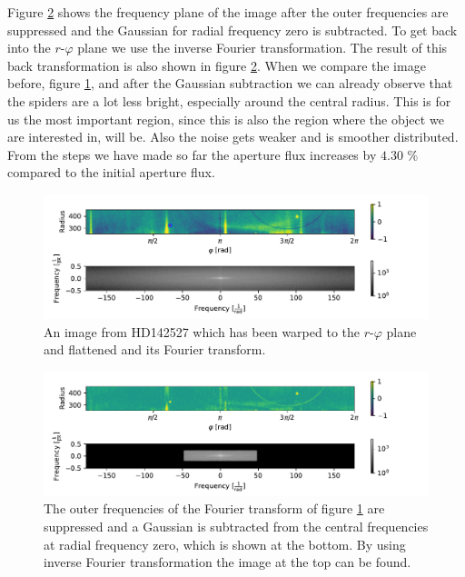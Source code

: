 Figure \ref{fig:HDcentralfreq_R254_R454_-1to1} shows the frequency plane of the image after the outer frequencies are suppressed and the Gaussian for radial frequency zero is subtracted. To get back into the $r$-$\varphi$ plane we use the inverse Fourier transformation. The result of this back transformation is also shown in figure \ref{fig:HDcentralfreq_R254_R454_-1to1}. When we compare the image before, figure \ref{fig:HDflatten_R254_R454_-1to1}, and after the Gaussian subtraction we can already observe that the spiders are a lot less bright, especially around the central radius. This is for us the most important region, since this is also the region where the object we are interested in, will be. Also the noise gets weaker and is smoother distributed. \\
From the steps we have made so far the aperture flux increases by $4.30$ \% compared to the initial aperture flux. 
\begin{figure}[H]
	\centering
		\includegraphics[width=1.0\textwidth]{pics/HDflatten_R254_R454_-1to1.pdf}
		\caption{An image from HD142527 which has been warped to the $r$-$\varphi$ plane and flattened and its Fourier transform.}
		\label{fig:HDflatten_R254_R454_-1to1}
\end{figure}
\begin{figure}[H]
	\centering
		\includegraphics[width=1.0\textwidth]{pics/HDcentralfreq_R254_R454_-1to1.pdf}
		\caption{The outer frequencies of the Fourier transform of figure \ref{fig:HDflatten_R254_R454_-1to1} are suppressed and a Gaussian is subtracted from the central frequencies at radial frequency zero, which is shown at the bottom. By using inverse Fourier transformation the image at the top can be found.}
		\label{fig:HDcentralfreq_R254_R454_-1to1}
\end{figure}